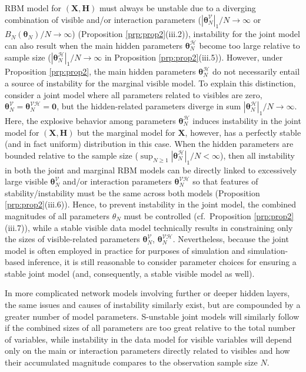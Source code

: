 \documentclass[12pt]{article}
\theoremstyle{definition}
\newcommand{\Gam}{B_{N}(\boldsymbol \theta_N) }
\begin{document}
RBM model for \((\boldsymbol X,\boldsymbol H)\) must always be unstable
due to a diverging combination of visible and/or interaction parameters
(\(|\boldsymbol \theta_N^{\mathcal{V}}|_1/N\to \infty\) or
\(\Gam/N\to \infty\)) (Proposition \ref{prp:prop2}(iii.2)), instability
for the joint model can also result when the main hidden parameters
\(\boldsymbol \theta_N^{\mathcal{H}}\) become too large relative to
sample size (\(|\boldsymbol \theta_N^{\mathcal{H}}|_1/N\to \infty\) in
Proposition \ref{prp:prop2}(iii.5)). However, under Proposition
\ref{prp:prop2}, the main hidden parameters
\(\boldsymbol \theta_N^{\mathcal{H}}\) do not necessarily entail a
source of instability for the marginal visible model. To explain this
distinction, consider a joint model where all parameters related to
visibles are zero,
\(\boldsymbol \theta_N^{\mathcal{V}}= \boldsymbol \theta_N^{\mathcal{VH}}=\boldsymbol 0\),
but the hidden-related parameters diverge in sum
\(|\boldsymbol \theta_N^{\mathcal{H}}|_1/N\to \infty\). Here, the
explosive behavior among parameters
\(\boldsymbol \theta_N^{\mathcal{H}}\) induces instability in the joint
model for \((\boldsymbol X, \boldsymbol H)\) but the marginal model for
\(\boldsymbol X\), however, has a perfectly stable (and in fact uniform)
distribution in this case. When the hidden parameters are bounded
relative to the sample size
(\(\sup_{N\geq 1} |\boldsymbol \theta_N^{\mathcal{H}}|_1/N<\infty\)),
then all instability in both the joint and marginal RBM models can be
directly linked to excessively large visible
\(\boldsymbol \theta_N^{\mathcal{V}}\) and/or interaction parameters
\(\boldsymbol \theta_N^{\mathcal{VH}}\) so that features of
stability/instability must be the same across both models (Proposition
\ref{prp:prop2}(iii.6)). Hence, to prevent instability in the joint
model, the combined magnitudes of all parameters \(\theta_N\) must be
controlled (cf.~Proposition \ref{prp:prop2}(iii.7)), while a stable
visible data model technically results in constraining only the sizes of
visible-related parameters \(\boldsymbol \theta_N^{\mathcal{V}}\),
\(\boldsymbol \theta_N^{\mathcal{VH}}\). Nevertheless, because the joint
model is often employed in practice for purposes of simulation and
simulation-based inference, it is still reasonable to consider parameter
choices for ensuring a stable joint model (and, consequently, a stable
visible model as well).

In more complicated network models involving further or deeper hidden
layers, the same issues and causes of instability similarly exist, but
are compounded by a greater number of model parameters. S-unstable joint
models will similarly follow if the combined sizes of all parameters are
too great relative to the total number of variables, while instability
in the data model for visible variables will depend only on the main or
interaction parameters directly related to visibles and how their
accumulated magnitude compares to the observation sample size \(N\).
\end{document}
